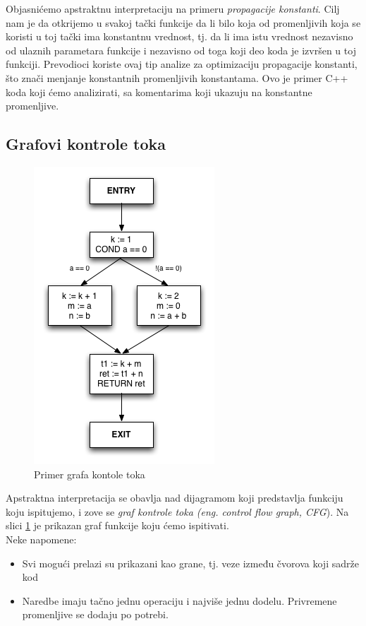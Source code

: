 Objasnićemo apstraktnu interpretaciju na primeru \emph{propagacije konstanti}. 
Cilj nam je da otkrijemo u svakoj tački funkcije da li bilo koja od promenljivih koja se koristi u toj tački ima konstantnu vrednost, tj. da li ima istu vrednost nezavisno od ulaznih parametara funkcije i nezavisno od toga koji deo koda je izvršen u toj funkciji. 
Prevodioci koriste ovaj tip analize za optimizaciju propagacije konstanti, što znači menjanje konstantnih promenljivih konstantama. 
Ovo je primer C++ koda koji ćemo analizirati, sa komentarima koji ukazuju na konstantne promenljive.


\subsection{Grafovi kontrole toka}
\label{subsec:cfgs}

\begin{figure}
\begin{center}
\includegraphics[scale=0.5]{Treehydra-cfg.png}
\end{center}
\caption{Primer grafa kontole toka}
\label{fig:graf}
\end{figure}

Apstraktna interpretacija se obavlja nad dijagramom koji predstavlja funkciju koju ispitujemo, i zove se \emph{graf kontrole toka (eng. control flow graph, CFG}). Na slici \ref{fig:graf} je prikazan graf funkcije koju ćemo ispitivati. \\
Neke napomene:
\begin{itemize}
\item Svi mogući prelazi su prikazani kao grane, tj. veze između čvorova koji sadrže kod
\item Naredbe imaju tačno jednu operaciju i najviše jednu dodelu. Privremene promenljive se dodaju po potrebi.
\end{itemize}

